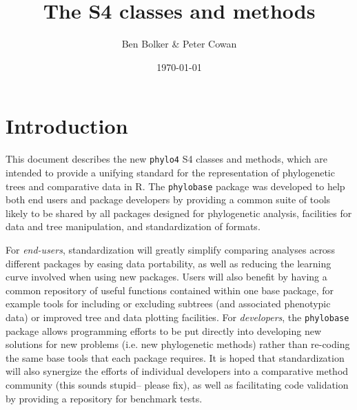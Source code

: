 \documentclass{article}
\title{The \code{phylo4} S4 classes and methods}
\author{Ben Bolker \& Peter Cowan}
\date{\today}
\newcommand{\code}[1]{{{\tt #1}}}
\begin{document}
\maketitle
\tableofcontents

\section{Introduction}

This document describes the new \code{phylo4} S4 classes and methods, which are intended to provide a unifying standard for the representation of phylogenetic trees and comparative data in R.  The \code{phylobase} package was developed to help both end users and package developers by providing a common suite of tools likely to be shared by all packages designed for phylogenetic analysis, facilities for data and tree manipulation, and standardization of formats. 

For \emph{end-users}, standardization will greatly simplify comparing analyses across different packages by easing data portability, as well as reducing the learning curve involved when using new packages. Users will also benefit by having a common repository of useful functions contained within one base package, for example tools for including or excluding subtrees (and associated phenotypic data) or improved tree and data plotting facilities. For \emph{developers}, the \code{phylobase} package allows programming efforts to be put directly into developing new solutions for new problems (i.e. new phylogenetic methods) rather than re-coding the same base tools that each package requires. It is hoped that standardization will also synergize the efforts of individual developers into a comparative method community (this sounds stupid-- please fix), as well as facilitating code validation by providing a repository for benchmark tests.
\end{document}
